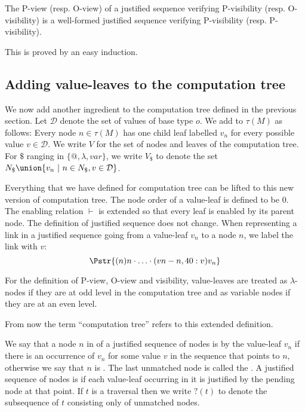 \begin{property}
\label{proper:pview_visibility}
The P-view (resp. O-view) of a justified sequence verifying P-visibility (resp. O-visibility)
is a well-formed justified sequence verifying P-visibility (resp. P-visibility).
\end{property}
This is proved by an easy induction.

\subsection{Adding value-leaves to the computation tree}
\label{sec:adding_value_leaves}

We now add another ingredient to the computation tree defined in
the previous section. Let $\mathcal{D}$
denote the set of values of base type $o$.  We add
 to $\tau(M)$ as follows: Every node $n \in \tau(M)$ has one child leaf labelled $v_n$ for every possible value $v \in \mathcal{D}$.
We write $V$ for the set of nodes and leaves of
the computation tree.  For $\$$ ranging in $\{@, \lambda, var \}$,
we write $V_\$$ to denote the set $N_\$ \union \{ v_n \ | \ n \in
N_\$, v \in \mathcal{D} \}$.


Everything that we have defined for computation tree can be lifted
to this new version of computation tree. The node order of a
value-leaf is defined to be $0$. The enabling relation $\vdash$ is
extended so that every leaf is enabled by its parent node. The
definition of justified sequence does not change.
When representing a link in a justified sequence going from a value-leaf $v_n$ to a node $n$,
we label the link with $v$:
$$
\Pstr{ (n){n} \cdot \ldots \cdot (vn-n,40:v){v_n} }
$$

For the definition
of P-view, O-view and visibility, value-leaves are treated as
$\lambda$-nodes if they are at odd level in the computation tree and
as variable nodes if they are at an even level.

From now the term ``computation tree'' refers to this extended
definition.
\vspace{10pt}

We say that a node $n$ in of a justified sequence of nodes is
 by the value-leaf $v_n$ if there is an occurrence of $v_n$ for some value $v$ in the
sequence that points to $n$, otherwise we say that $n$ is
. The last unmatched node is called the
.  A justified sequence of nodes is
 if each value-leaf occurring in it is justified by the pending node at that point.
If $t$ is a traversal then we write
$?(t)$ to denote the subsequence of $t$ consisting only of unmatched
nodes.


